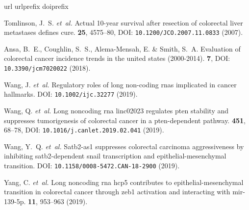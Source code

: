\documentclass[fleqn,10pt]{wlscirep}
\begin{document}
\begin{thebibliography}{10}
\expandafter\ifx\csname url\endcsname\relax
  \def\url#1{\texttt{#1}}\fi
\expandafter\ifx\csname urlprefix\endcsname\relax\def\urlprefix{URL }\fi
\expandafter\ifx\csname doiprefix\endcsname\relax\def\doiprefix{DOI: }\fi
\providecommand{\bibinfo}[2]{#2}
\providecommand{\eprint}[2][]{\url{#2}}

\bibinfo{author}{Tomlinson, J.~S.} \emph{et~al.}
\newblock \bibinfo{journal}{\bibinfo{title}{Actual 10-year survival after
  resection of colorectal liver metastases defines cure}}.
 \textbf{\bibinfo{volume}{25}},
  \bibinfo{pages}{4575--80}, \doiprefix\url{10.1200/JCO.2007.11.0833}
  (\bibinfo{year}{2007}).

\bibinfo{author}{Ansa, B.~E.}, \bibinfo{author}{Coughlin, S.~S.},
  \bibinfo{author}{Alema-Mensah, E.} \& \bibinfo{author}{Smith, S.~A.}
\newblock \bibinfo{journal}{\bibinfo{title}{Evaluation of colorectal cancer
  incidence trends in the united states (2000-2014)}}.
 \textbf{\bibinfo{volume}{7}},
  \doiprefix\url{10.3390/jcm7020022} (\bibinfo{year}{2018}).

\bibinfo{author}{Wang, J.} \emph{et~al.}
\newblock \bibinfo{journal}{\bibinfo{title}{Regulatory roles of long non-coding
  rnas implicated in cancer hallmarks}}.
  \doiprefix\url{10.1002/ijc.32277} (\bibinfo{year}{2019}).

\bibinfo{author}{Wang, Q.} \emph{et~al.}
\newblock \bibinfo{journal}{\bibinfo{title}{Long noncoding rna linc02023
  regulates pten stability and suppresses tumorigenesis of colorectal cancer in
  a pten-dependent pathway}}.
 \textbf{\bibinfo{volume}{451}},
  \bibinfo{pages}{68--78}, \doiprefix\url{10.1016/j.canlet.2019.02.041}
  (\bibinfo{year}{2019}).

\bibinfo{author}{Wang, Y.~Q.} \emph{et~al.}
\newblock \bibinfo{journal}{\bibinfo{title}{Satb2-as1 suppresses colorectal
  carcinoma aggressiveness by inhibiting satb2-dependent snail transcription
  and epithelial-mesenchymal transition}}.
  \doiprefix\url{10.1158/0008-5472.CAN-18-2900} (\bibinfo{year}{2019}).

\bibinfo{author}{Yang, C.} \emph{et~al.}
\newblock \bibinfo{journal}{\bibinfo{title}{Long noncoding rna hcp5 contributes
  to epithelial-mesenchymal transition in colorectal cancer through zeb1
  activation and interacting with mir-139-5p}}.
  \textbf{\bibinfo{volume}{11}}, \bibinfo{pages}{953--963}
  (\bibinfo{year}{2019}).


\end{thebibliography}
\end{document}
